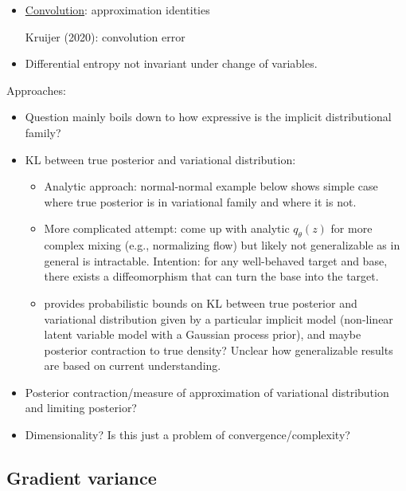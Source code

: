 \documentclass[10pt]{article}
\begin{document}
\begin{itemize}
\begin{itemize}
\item
\href{https://www2.math.upenn.edu/~kazdan/508F10/convolution.pdf}{Convolution}: approximation identities

Kruijer (2020): convolution error

\item
Differential entropy not invariant under change of variables.

\end{itemize}
\end{itemize}

Approaches:
\begin{itemize}

\item
Question mainly boils down to how expressive is the implicit distributional family?

\item
KL between true posterior and variational distribution:
\begin{itemize}
\item
Analytic approach: normal-normal example below shows simple case where true posterior is in variational family and where it is not.
\item
More complicated attempt: come up with analytic $q_\theta(z)$ for more complex mixing (e.g., normalizing flow) but likely not generalizable as in general is intractable. Intention: for any well-behaved target and base, there exists a diffeomorphism that can turn the base into the target.
\item
\citet{Plummer:2021} provides probabilistic bounds on KL between true posterior and variational distribution given by a particular implicit model (non-linear latent variable model with a Gaussian process prior), and maybe posterior contraction to true density? Unclear how generalizable results are based on current understanding.
\end{itemize}

\item
Posterior contraction/measure of approximation of variational distribution and limiting posterior?

\item
Dimensionality? Is this just a problem of convergence/complexity?

\end{itemize}


\subsection{Gradient variance}
\end{document}

